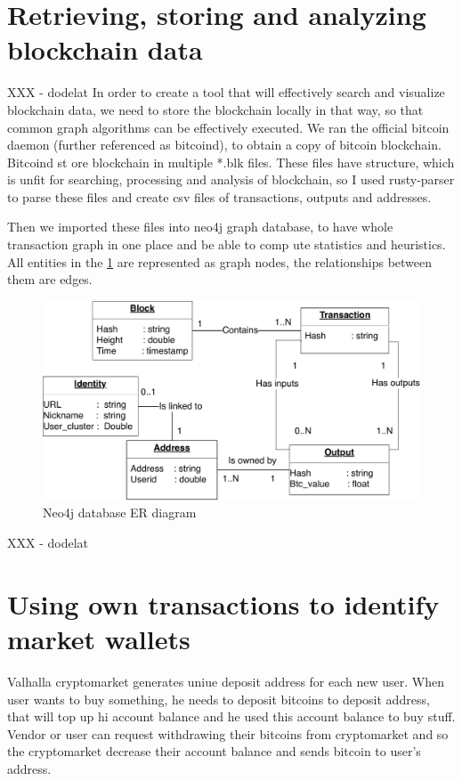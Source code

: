 \documentclass[
  digital, %
  table,   %
  lof,     %
  lot,     %
  oneside
]{fithesis3}
\begin{document}
\section{Retrieving, storing and analyzing blockchain data}
XXX - dodelat
In order to create a tool that will effectively search and visualize blockchain data,
we need to store the blockchain locally in that way, so that common graph algorithms can be effectively executed.
We ran the official bitcoin daemon (further referenced as bitcoind), to obtain a copy of bitcoin blockchain. Bitcoind st
ore blockchain in multiple *.blk files.
These files have structure, which is unfit for searching, processing and analysis of blockchain, so I used rusty-parser 
to parse these files and create csv files of transactions, outputs and addresses.

Then we imported these files into neo4j graph database, to have whole transaction graph in one place and be able to comp
ute statistics and heuristics.
All entities in the \ref{neo4jschema} are represented as graph nodes, the relationships between them are edges.
\begin{figure}[!htb]
    \centering
    \includegraphics[width=1\textwidth]{neo4j-schema}
    \caption{Neo4j database ER diagram}
    \label{neo4jschema}
\end{figure}
XXX - dodelat

\section{Using own transactions to identify market wallets}
\label{Using own transactions to identify market wallets}

Valhalla cryptomarket generates uniue deposit address for each new user.
When user wants to buy something, he needs to deposit bitcoins to deposit address,
that will top up hi account balance and he used this account balance to buy stuff.
Vendor or user can request withdrawing their bitcoins from cryptomarket and so
the cryptomarket decrease their account balance and sends bitcoin to user's address.
\end{document}
